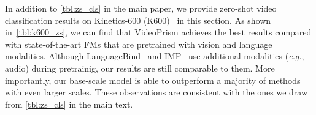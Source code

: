 \documentclass{article}
\theoremstyle{plain}
\theoremstyle{definition}
\theoremstyle{remark}
\newcommand{\OURS}{VideoPrism\xspace}
\newcommand{\eg}{\textit{e.g.}\xspace}
\begin{document}
In addition to \cref{tbl:zs_cls} in the main paper, we provide zero-shot video classification results on Kinetics-600 (K600)~\cite{carreira2018short} in this section. As shown in~\cref{tbl:k600_zs}, we can find that \OURS achieves the best results compared with state-of-the-art FMs that are pretrained with vision and language modalities. Although LanguageBind~\cite{zhu2023languagebind} and IMP~\cite{akbari2023alternating} use additional modalities (\eg, audio) during pretrainig, our results are still comparable to them. More importantly, our base-scale model is able to outperform a majority of methods with even larger scales. These observations are consistent with the ones we draw from \cref{tbl:zs_cls} in the main text. \begin{table}[t]
\caption{\textbf{Datasets included in Academic-Corpus.}}
\label{tbl:academic_corpus}
\vskip 0.1in
\begin{center}
\end{center}
\vskip -0.1in
\end{table}
\end{document}
